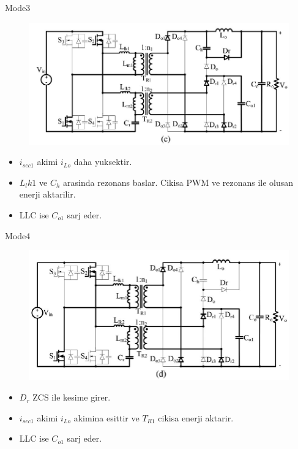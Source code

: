\documentclass[10pt]{beamer}
\begin{document}
\begin{frame}{Mode3}
	\begin{figure}
		\centering
		\includegraphics[scale=0.30]{mode_c.png}
	\end{figure}
	\begin{itemize}
		\item $i_{sec1}$ akimi $i_{Lo}$ daha yuksektir.
		\item $L_lk1$ ve $C_h$ arasinda rezonans baslar. Cikisa PWM ve rezonans ile olusan enerji aktarilir.
		\item LLC ise $C_{o1}$ sarj eder.
	\end{itemize}
\end{frame}

\begin{frame}{Mode4}
	\begin{figure}
		\centering
		\includegraphics[scale=0.30]{mode_d.png}
	\end{figure}
	\begin{itemize}
		\item $D_r$ ZCS ile kesime girer.
		\item $i_{sec1}$ akimi $i_{Lo}$ akimina esittir ve $T_{R1}$ cikisa enerji aktarir.
		\item LLC ise $C_{o1}$ sarj eder.
	\end{itemize}
\end{frame}
\end{document}
